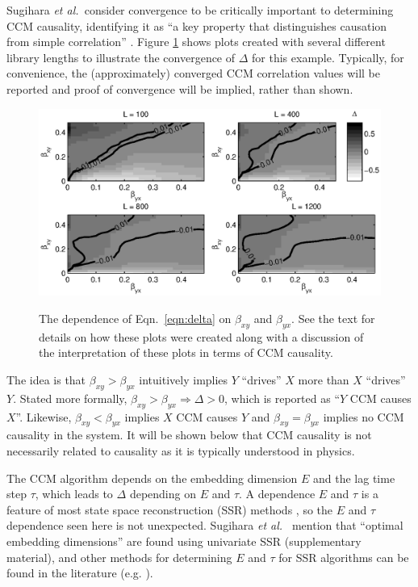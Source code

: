 \documentclass[twocolumn,aps,pre,groupedaddress]{revtex4-1}
\begin{document}
Sugihara {\em et al.\ }consider convergence to be critically important to determining CCM causality, identifying it as ``a key property that distinguishes causation from simple correlation'' \cite{Sugihara2012}.  Figure \ref{fig:BGridPlot} shows plots created with several different library lengths to illustrate the convergence of $\Delta$ for this example.  Typically, for convenience, the (approximately) converged CCM correlation values will be reported and proof of convergence will be implied, rather than shown.
\begin{figure}[ht]
\label{fig:BGridPlot}
\includegraphics[scale=0.55]{Figure1.eps}\\
\caption{The dependence of Eqn.\ \ref{eqn:delta} on $\beta_{xy}$ and $\beta_{yx}$.  See the text for details on how these plots were created along with a discussion of the interpretation of these plots in terms of CCM causality.}
\end{figure}

The idea is that $\beta_{xy}>\beta_{yx}$ intuitively implies $Y$ ``drives'' $X$ more than $X$ ``drives'' $Y$.  Stated more formally, $\beta_{xy}>\beta_{yx}\Rightarrow\Delta>0$, which is reported as ``$Y$ CCM causes $X$''.  Likewise, $\beta_{xy}<\beta_{yx}$ implies $X$ CCM causes $Y$ and $\beta_{xy}=\beta_{yx}$ implies no CCM causality in the system.  It will be shown below that CCM causality is not necessarily related to causality as it is typically understood in physics.

The CCM algorithm depends on the embedding dimension $E$ and the lag time step $\tau$, which leads to $\Delta$ depending on $E$ and $\tau$.  A dependence $E$ and $\tau$ is a feature of most state space reconstruction (SSR) methods \cite{Hong2006,vlachos2009,Small2004}, so the $E$ and $\tau$ dependence seen here is not unexpected.  Sugihara {\em et al.\ } mention that ``optimal embedding dimensions'' are found using univariate SSR \cite{Sugihara2012} (supplementary material), and other methods for determining $E$ and $\tau$ for SSR algorithms can be found in the literature (e.g. \cite{Hong2006,Small2004,Kennel1992}).
\end{document}
